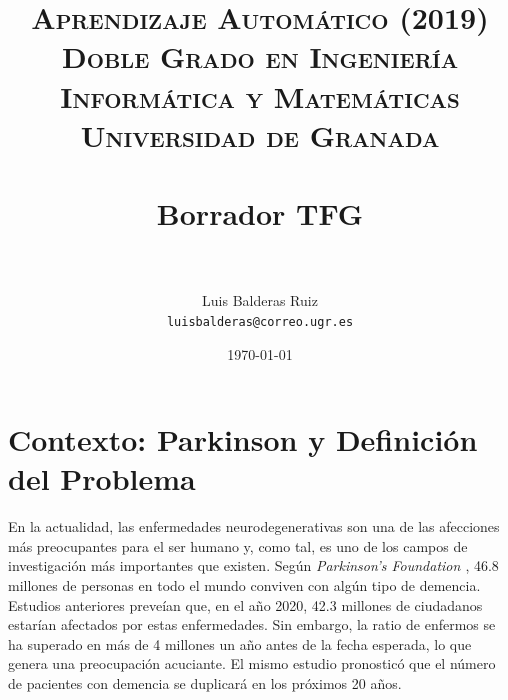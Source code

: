 
\graphicspath{ {./images/} }
\usepackage{subcaption}
\usepackage{hyperref}
\usepackage{soul}
\usepackage{amssymb}



\title{	
	\normalfont \normalsize 
	\textsc{\textbf{Aprendizaje Automático (2019)} \\ Doble Grado en Ingeniería Informática y Matemáticas \\ Universidad de Granada} \\ [25pt] %
	\horrule{0.5pt} \\[0.4cm] %
	\huge Borrador TFG \\ %
	\horrule{2pt} \\[0.5cm] %
}

\author{Luis Balderas Ruiz \\ \texttt{luisbalderas@correo.ugr.es}} 


\date{\normalsize\today} %



	
	\maketitle %
	
	\newpage %
	
	\tableofcontents %
	
	\listoffigures
	
	\listoftables
	
	\newpage




\section{Contexto: Parkinson y Definición del Problema}

En la actualidad, las enfermedades neurodegenerativas son una de las afecciones más preocupantes para el ser humano y, como tal, es uno de los campos de investigación más importantes que existen. Según \textit{Parkinson's Foundation \cite{pf}}, 46.8 millones de personas en todo el mundo conviven con algún tipo de demencia. Estudios anteriores preveían que, en el año 2020, 42.3 millones de ciudadanos estarían afectados por estas enfermedades. Sin embargo, la ratio de enfermos se ha superado en más de 4 millones un año antes de la fecha esperada, lo que genera una preocupación acuciante. El mismo estudio pronosticó que el número de pacientes con demencia se duplicará en los próximos 20 años. \\

